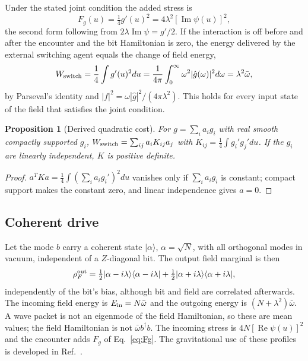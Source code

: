 \documentclass[aps,pre,onecolumn,superscriptaddress,floatfix,longbibliography]{revtex4-2}
\newtheorem{proposition}[theorem]{Proposition}
\begin{document}
Under the stated joint condition the added stress is
\begin{equation}
F_g(u)=\tfrac14g'(u)^2=4\lambda^2[\operatorname{Im}\psi(u)]^2,
\label{eq:Fg}
\end{equation}
the second form following from $2\lambda\operatorname{Im}\psi=g'/2$. If the interaction is off before and after the encounter and the bit Hamiltonian is zero, the energy delivered by the external switching agent equals the change of field energy,
\begin{equation}
W_{\rm switch}=\frac14\int g'(u)^2du=\frac1{4\pi}\int_0^\infty\omega^2|\hat g(\omega)|^2d\omega=\lambda^2\bar\omega,
\label{eq:work}
\end{equation}
by Parseval's identity and $|f|^2=\omega|\hat g|^2/(4\pi\lambda^2)$. This holds for every input state of the field that satisfies the joint condition.

\begin{proposition}[Derived quadratic cost]
\label{prop:K}
For $g=\sum_ia_ig_i$ with real smooth compactly supported $g_i$, $W_{\rm switch}=\sum_{ij}a_iK_{ij}a_j$ with $K_{ij}=\tfrac14\int g_i'g_j'du$. If the $g_i$ are linearly independent, $K$ is positive definite.
\end{proposition}

\begin{proof}
$a^TKa=\tfrac14\int(\sum_ia_ig_i')^2du$ vanishes only if $\sum_ia_ig_i$ is constant; compact support makes the constant zero, and linear independence gives $a=0$.
\end{proof}

\subsection{Coherent drive}

Let the mode $b$ carry a coherent state $|\alpha\rangle$, $\alpha=\sqrt N$, with all orthogonal modes in vacuum, independent of a $Z$-diagonal bit. The output field marginal is then
\begin{equation}
\rho_F^{\rm out}=\tfrac12|\alpha-i\lambda\rangle\langle\alpha-i\lambda|+\tfrac12|\alpha+i\lambda\rangle\langle\alpha+i\lambda|,
\end{equation}
independently of the bit's bias, although bit and field are correlated afterwards. The incoming field energy is $E_{\rm in}=N\bar\omega$ and the outgoing energy is $(N+\lambda^2)\bar\omega$. A wave packet is not an eigenmode of the field Hamiltonian, so these are mean values; the field Hamiltonian is not $\bar\omega b^\dagger b$. The incoming stress is $4N[\operatorname{Re}\psi(u)]^2$ and the encounter adds $F_g$ of Eq.~\eqref{eq:Fg}. The gravitational use of these profiles is developed in Ref.~\cite{Liu2026HAFFD}.
\end{document}
